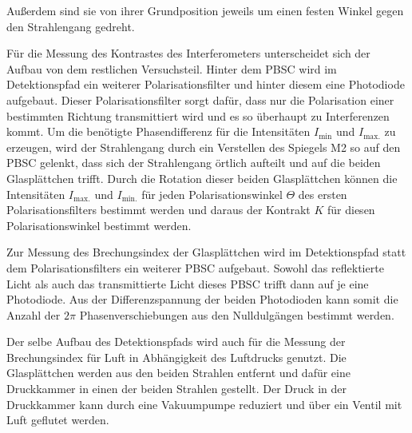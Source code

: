Außerdem sind sie von ihrer Grundposition jeweils um einen festen Winkel gegen den Strahlengang gedreht.
\par\medskip
Für die Messung des Kontrastes des Interferometers unterscheidet sich der Aufbau von dem restlichen Versuchsteil.
Hinter dem PBSC wird im Detektionspfad ein weiterer Polarisationsfilter und hinter diesem eine Photodiode aufgebaut.
Dieser Polarisationsfilter sorgt dafür, dass nur die Polarisation einer bestimmten Richtung transmittiert wird und es so überhaupt zu Interferenzen kommt.
Um die benötigte Phasendifferenz für die Intensitäten $I_\text{min}$ und $I_\text{max.}$ zu erzeugen, wird der Strahlengang durch ein Verstellen des Spiegels M2 so auf den PBSC gelenkt, dass sich der Strahlengang örtlich aufteilt und auf die beiden Glasplättchen trifft.
Durch die Rotation dieser beiden Glasplättchen können die Intensitäten $I_\text{max.}$ und $I_\text{min.}$ für jeden Polarisationswinkel $\Theta$ des ersten Polarisationsfilters bestimmt werden und daraus der Kontrakt $K$ für diesen Polarisationswinkel bestimmt werden.
\par\medskip
Zur Messung des Brechungsindex der Glasplättchen wird im Detektionspfad statt dem Polarisationsfilters ein weiterer PBSC aufgebaut.
Sowohl das reflektierte Licht als auch das transmittierte Licht dieses PBSC trifft dann auf je eine Photodiode.
Aus der Differenzspannung der beiden Photodioden kann somit die Anzahl der $2\pi$ Phasenverschiebungen aus den Nulldulgängen bestimmt werden.
\par\smallskip
Der selbe Aufbau des Detektionspfads wird auch für die Messung der Brechungsindex für Luft in Abhängigkeit des Luftdrucks genutzt.
Die Glasplättchen werden aus den beiden Strahlen entfernt und dafür eine Druckkammer in einen der beiden Strahlen gestellt.
Der Druck in der Druckkammer kann durch eine Vakuumpumpe reduziert und über ein Ventil mit Luft geflutet werden.
